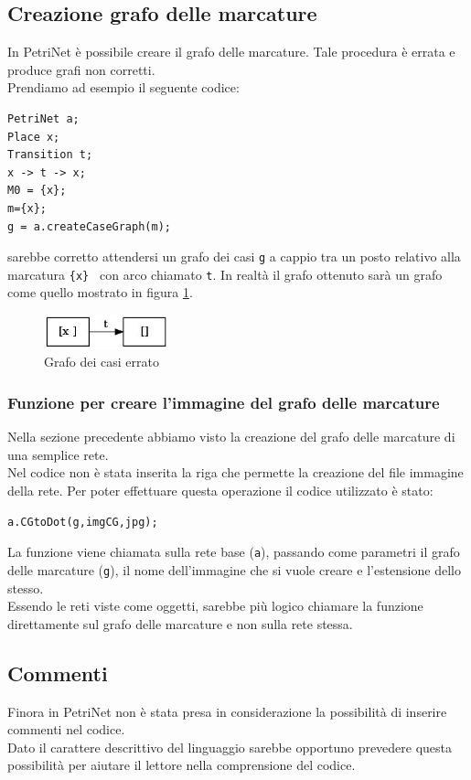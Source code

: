 \documentclass[italian,12pt]{book}
\begin{document}
\subsection{Creazione grafo delle marcature}
In PetriNet è possibile creare il grafo delle marcature. Tale procedura è errata e produce 
grafi non corretti. \\
Prendiamo ad esempio il seguente codice:
\begin{verbatim}PetriNet a;
Place x;
Transition t;
x -> t -> x;
M0 = {x};
m={x};
g = a.createCaseGraph(m);
\end{verbatim}
sarebbe corretto attendersi un grafo dei casi {\tt g} a cappio tra un posto relativo alla marcatura 
{\tt \{x\} } con arco chiamato {\tt t}. In realtà il grafo ottenuto sarà un grafo come quello mostrato
in figura \ref{fig:err_grafo_casi_1}.
\begin{figure}[htb]
\centerline{\includegraphics[height=1cm]{img/CG1.jpg}}
\caption{Grafo dei casi errato}\label{fig:err_grafo_casi_1}
\end{figure}

\subsubsection{Funzione per creare l'immagine del grafo delle marcature}
Nella sezione precedente abbiamo visto la creazione del grafo delle marcature di una semplice rete. \\
Nel codice non è stata inserita la riga che permette la creazione del file immagine della rete. Per poter
effettuare questa operazione il codice utilizzato è stato: \begin{verbatim}a.CGtoDot(g,imgCG,jpg);\end{verbatim}
La funzione viene chiamata sulla rete base ({\tt a}), passando come parametri il grafo delle marcature ({\tt g}), 
il nome dell'immagine che si vuole creare e l'estensione dello stesso.\\
Essendo le reti viste come oggetti, sarebbe più logico chiamare la funzione direttamente sul grafo delle 
marcature e non sulla rete stessa.

\subsection{Commenti}
Finora in PetriNet non è stata presa in considerazione la possibilità di inserire commenti
nel codice.\\
Dato il carattere descrittivo del linguaggio sarebbe opportuno prevedere questa possibilità
per aiutare il lettore nella comprensione del codice.
\end{document}
